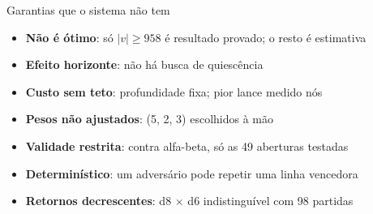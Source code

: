 \documentclass[10pt,aspectratio=169]{beamer}
\begin{document}
\begin{frame}{Garantias que o sistema não tem}
\begin{itemize}
  \item \textbf{Não é ótimo}: só $|v| \ge 958$ é resultado provado; o resto é estimativa
  \item \textbf{Efeito horizonte}: não há busca de quiescência
  \item \textbf{Custo sem teto}: profundidade fixa; pior lance medido  nós
  \item \textbf{Pesos não ajustados}: (5, 2, 3) escolhidos à mão
  \item \textbf{Validade restrita}: contra alfa-beta, só as 49 aberturas testadas
  \item \textbf{Determinístico}: um adversário pode repetir uma linha vencedora
  \item \textbf{Retornos decrescentes}: d8 $\times$ d6 indistinguível com 98 partidas
\end{itemize}
\end{frame}
\end{document}
